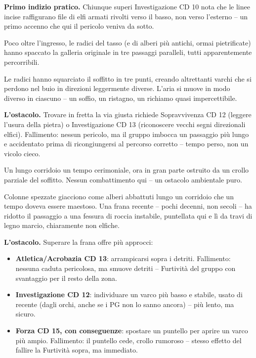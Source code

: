 \textbf{Primo indizio pratico.} Chiunque superi Investigazione CD 10 nota che le linee incise raffigurano file di elfi armati rivolti verso il basso, non verso l'esterno -- un primo accenno che qui il pericolo veniva da sotto.


Poco oltre l'ingresso, le radici del tasso (e di alberi più antichi, ormai pietrificate) hanno spaccato la galleria originale in tre passaggi paralleli, tutti apparentemente percorribili.

\begin{DndReadAloud}[]
  Le radici hanno squarciato il soffitto in tre punti, creando altrettanti varchi che si perdono nel buio in direzioni leggermente diverse. L'aria si muove in modo diverso in ciascuno -- un soffio, un ristagno, un richiamo quasi impercettibile.
\end{DndReadAloud}

\textbf{L'ostacolo.} Trovare in fretta la via giusta richiede Sopravvivenza CD 12 (leggere l'usura della pietra) o Investigazione CD 13 (riconoscere vecchi segni direzionali elfici). Fallimento: nessun pericolo, ma il gruppo imbocca un passaggio più lungo e accidentato prima di ricongiungersi al percorso corretto -- tempo perso, non un vicolo cieco.


Un lungo corridoio un tempo cerimoniale, ora in gran parte ostruito da un crollo parziale del soffitto. Nessun combattimento qui -- un ostacolo ambientale puro.

\begin{DndReadAloud}[]
  Colonne spezzate giacciono come alberi abbattuti lungo un corridoio che un tempo doveva essere maestoso. Una frana recente -- pochi decenni, non secoli -- ha ridotto il passaggio a una fessura di roccia instabile, puntellata qui e lì da travi di legno marcio, chiaramente non elfiche.
\end{DndReadAloud}

\textbf{L'ostacolo.} Superare la frana offre più approcci:

\begin{itemize}
  \item \textbf{Atletica/Acrobazia CD 13}: arrampicarsi sopra i detriti. Fallimento: nessuna caduta pericolosa, ma smuove detriti -- Furtività del gruppo con svantaggio per il resto della zona.
  \item \textbf{Investigazione CD 12}: individuare un varco più basso e stabile, usato di recente (dagli orchi, anche se i PG non lo sanno ancora) -- più lento, ma sicuro.
  \item \textbf{Forza CD 15, con conseguenze}: spostare un puntello per aprire un varco più ampio. Fallimento: il puntello cede, crollo rumoroso -- stesso effetto del fallire la Furtività sopra, ma immediato.
\end{itemize}

